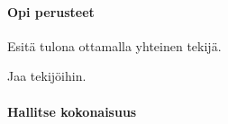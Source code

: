 \begin{tehtavasivu}

\paragraph*{Opi perusteet}

\begin{tehtava}
    Esitä tulona ottamalla yhteinen tekijä.
    \begin{alakohdat}
    \end{alakohdat}
    \begin{vastaus}
        \begin{alakohdat}
        \end{alakohdat}
    \end{vastaus}
\end{tehtava}

\begin{tehtava}
    Jaa tekijöihin.
    \begin{alakohdat}
    \end{alakohdat}
    \begin{vastaus}
        \begin{alakohdat}
        \end{alakohdat}
    \end{vastaus}
\end{tehtava}

\paragraph*{Hallitse kokonaisuus}




\end{tehtavasivu}
